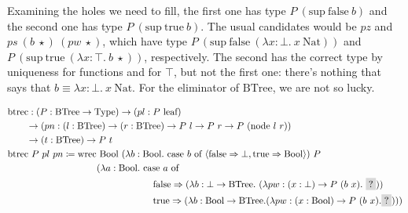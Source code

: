 \documentclass{report}
\newcommand{\Nat}{\const{Nat}}
\newcommand{\zero}{\const{zero}}
\renewcommand{\succ}{\const{succ}}
\newcommand{\BTree}{\const{BTree}}
\newcommand{\leaf}{\const{leaf}}
\newcommand{\node}{\const{node}}
\newcommand{\Bool}{\const{Bool}}
\newcommand{\true}{\const{true}}
\newcommand{\false}{\const{false}}
\renewcommand{\sup}{\const{sup}}
\newcommand{\const}[1]{\text{#1}}
\newcommand{\hole}{\colorbox{gray!30}{?}}
\newcommand{\Type}{\const{Type}}
\newcommand{\case}{\const{case}}
\newcommand{\of}{\const{of}}
\begin{document}
Examining the holes we need to fill, the first one has type $P ~ (\sup ~ \false ~ b)$ and the second one has type $P ~ (\sup ~ \true ~ b)$. The usual candidates would be $pz$ and $ps ~ (b ~ \star) ~ (pw ~ \star)$, which have type $P ~ (\sup ~ \false ~ (\lambda x: \bot. ~ x ~ \Nat))$ and $P ~ (\sup ~ \true ~ (\lambda x: \top. ~ b ~ \star))$, respectively. The second has the correct type by uniqueness for functions and for $\top$, but not the first one: there's nothing that says that $b \equiv \lambda x: \bot. ~ x ~ \Nat$. For the eliminator of $\BTree$, we are not so lucky.

\iffalse
We first examine the type of the second branch. By the type of $\const{wrec}$, we are expected to provide a function that returns something of type $P ~ (\sup ~ \true ~ b)$ (omitting the type arguments $A$ and $B$). What we have provided is $ps ~ (b ~ \star) ~ (pw ~ \star)$, which has type $P ~ (\succ ~ (b ~ \star)) \equiv P ~ (\sup ~ \true ~ (\lambda x: \top. ~ b ~ \star))$. By $\eta_2$-reduction for $\top$, this becomes the correct type.

Now we examine the hole that we must fill. We have that its type must be $P ~ (\sup ~ \false ~ b)$, and the obvious candidate is $pz$. Unfortunately, it doesn't have the correct type: its type is $P ~ \zero \equiv P ~ (\sup ~ \false ~ (\lambda x: \bot. ~ x ~ \Nat))$. There's nothing that says that $b \equiv \lambda x: \bot. ~ x ~ \Nat$. This problem is not limited the eliminator for naturals: the leaves of binary trees are defined in exactly the same manner, so its first branch would have the same issue.
\fi

\begin{align*}
    &\const{btrec}: (P: \BTree \to \Type) \to (pl: P ~ \leaf) \\
    &\qquad\to (pn: (l: \BTree) \to (r: \BTree) \to P ~ l \to P ~ r \to P ~ (\node ~ l ~ r)) \\
    &\qquad\to (t: \BTree) \to P ~ t \\
    &\const{btrec} ~ P ~ pl ~ pn \coloneqq \const{wrec} ~ \Bool ~ (\lambda b: \Bool. ~ \case ~ b ~ \of ~ \langle \false \Rightarrow \bot, \true \Rightarrow \Bool \rangle) ~ P \\
    &\hspace{9.5em} (\lambda a: \Bool. ~ \case ~ a ~ \of \\
    &\hspace{15.5em} \false \Rightarrow (\lambda b: \bot \to \BTree. ~ (\lambda pw: (x: \bot) \to P ~ (b ~ x). ~ \hole)) \\
    &\hspace{15.5em} \true \Rightarrow (\lambda b: \Bool \to \BTree. (\lambda pw: (x: \Bool) \to P ~ (b ~ x). \hole)))
\end{align*}
\end{document}
